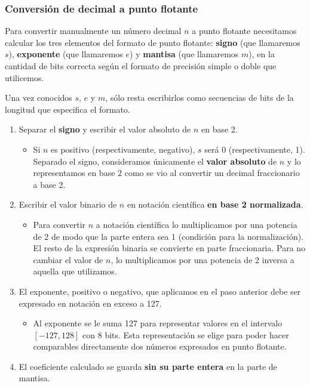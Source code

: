 \documentclass[spanish,A4,]{article}
\begin{document}
\subsubsection{Conversión de decimal a punto
flotante}\label{conversiuxf3n-de-decimal-a-punto-flotante}

Para convertir manualmente un número decimal $n$ a punto flotante
necesitamos calcular los tres elementos del formato de punto flotante:
\textbf{signo} (que llamaremos $s$), \textbf{exponente} (que llamaremos
$e$) y \textbf{mantisa} (que llamaremos $m$), en la cantidad de bits
correcta según el formato de precisión simple o doble que utilicemos.

Una vez conocidos $s$, $e$ y $m$, sólo resta escribirlos como secuencias
de bits de la longitud que especifica el formato.

\begin{enumerate}
\def\labelenumi{\arabic{enumi}.}
\itemsep1pt\parskip0pt
\item
  Separar el \textbf{signo} y escribir el valor absoluto de $n$ en base
  2.

  \begin{itemize}
  \itemsep1pt\parskip0pt
  \item
    Si $n$ es positivo (respectivamente, negativo), $s$ será 0
    (respectivamente, 1). Separado el signo, consideramos únicamente el
    \textbf{valor absoluto} de $n$ y lo representamos en base 2 como se
    vio al convertir un decimal fraccionario a base 2.
  \end{itemize}
\item
  Escribir el valor binario de $n$ en notación científica \textbf{en
  base 2 normalizada}.

  \begin{itemize}
  \itemsep1pt\parskip0pt
  \item
    Para convertir $n$ a notación científica lo multiplicamos por una
    potencia de 2 de modo que la parte entera sea 1 (condición para la
    normalización). El resto de la expresión binaria se convierte en
    parte fraccionaria. Para no cambiar el valor de $n$, lo
    multiplicamos por una potencia de 2 inversa a aquella que
    utilizamos.
  \end{itemize}
\item
  El exponente, positivo o negativo, que aplicamos en el paso anterior
  debe ser expresado en notación en exceso a 127.

  \begin{itemize}
  \itemsep1pt\parskip0pt
  \item
    Al exponente se le suma 127 para representar valores en el intervalo
    $[-127,128]$ con 8 bits. Esta representación se elige para poder
    hacer comparables directamente dos números expresados en punto
    flotante.
  \end{itemize}
\item
  El coeficiente calculado se guarda \textbf{sin su parte entera} en la
  parte de mantisa.


\end{enumerate}
\end{document}
